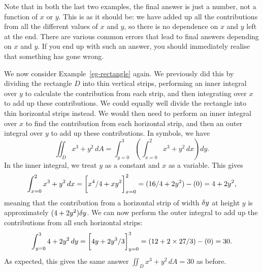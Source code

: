 \documentclass[reqno]{amsart}
\theoremstyle{definition}
\begin{document}
Note that in both the last two examples, the final answer is just a
number, not a function of $x$ or $y$.  This is as it should be: we
have added up all the contributions from all the different values of
$x$ and $y$, so there is no dependence on $x$ and $y$ left at the
end.  There are various common errors that lead to final answers
depending on $x$ and $y$.  If you end up with such an answer, you
should immediately realise that something has gone wrong.

We now consider Example~\ref{eg-rectangle} again.  We previously did
this by dividing the rectangle $D$ into thin vertical strips,
performing an inner integral over $y$ to calculate the contribution
from each strip, and then integrating over $x$ to add up these
contributions.  We could equally well divide the rectangle into thin
horizontal strips instead.  We would then need to perform an inner
integral over $x$ to find the contribution from each horizontal strip,
and then an outer integral over $y$ to add up these contributions.  In
symbols, we have 
\[ \iint_D x^3+y^2\,dA = 
    \int_{y=0}^3 \left(\int_{x=0}^2 x^3+y^2\,dx\right) dy.
\]
In the inner integral, we treat $y$ as a constant and $x$ as a
variable.  This gives 
\[ \int_{x=0}^2 x^3+y^2\,dx = 
    \CH{ x^4/4 + xy^2 }_{x=0}^2 = 
     (16/4+2y^2)-(0) = 4 + 2y^2,
\]
meaning that the contribution from a horizontal strip of width $\delta y$
at height $y$ is approximately $(4+2y^2)\delta y$.  We can now perform
the outer integral to add up the contributions from all such
horizontal strips:
\[ \int_{y=0}^3 4+2y^2\,dy = \CH{4y+2y^3/3}_{y=0}^3 =
    (12+2\tm 27/3)-(0) = 30.
\]
As expected, this gives the same answer $\iint_D x^3+y^2\,dA=30$ as
before. 
\end{document}
